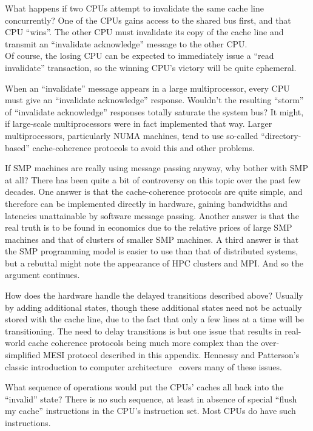 \begin{enumerate}
\QuickQ{}
	What happens if two CPUs attempt to invalidate the
	same cache line concurrently?
\QuickA{}
	One of the CPUs gains access
	to the shared bus first,
	and that CPU ``wins''.  The other CPU must invalidate its copy of the
	cache line and transmit an ``invalidate acknowledge'' message
	to the other CPU. \\
	Of course, the losing CPU can be expected to immediately issue a
	``read invalidate'' transaction, so the winning CPU's victory will
	be quite ephemeral.

\QuickQ{}
	When an ``invalidate'' message appears in a large multiprocessor,
	every CPU must give an ``invalidate acknowledge'' response.
	Wouldn't the resulting ``storm'' of ``invalidate acknowledge''
	responses totally saturate the system bus?
\QuickA{}
	It might, if large-scale multiprocessors were in fact implemented
	that way.  Larger multiprocessors, particularly NUMA machines,
	tend to use so-called ``directory-based'' cache-coherence
	protocols to avoid this and other problems.

\QuickQ{}
	If SMP machines are really using message passing
	anyway, why bother with SMP at all?
\QuickA{}
	There has been quite a bit of controversy on this topic over
	the past few decades.  One answer is that the cache-coherence
	protocols are quite simple, and therefore can be implemented
	directly in hardware, gaining bandwidths and latencies
	unattainable by software message passing.  Another answer is that
	the real truth is to be found in economics due to the relative
	prices of large SMP machines and that of clusters of smaller
	SMP machines.  A third answer is that the SMP programming
	model is easier to use than that of distributed systems, but
	a rebuttal might note the appearance of HPC clusters and MPI.
	And so the argument continues.

\QuickQ{}
	How does the hardware handle the delayed transitions
	described above?
\QuickA{}
	Usually by adding additional states, though these additional
	states need not be actually stored with the cache line, due to
	the fact that only a few lines at a time will be transitioning.
	The need to delay transitions is but one issue that results in
	real-world cache coherence protocols being much more complex than
	the over-simplified MESI protocol described in this appendix.
	Hennessy and Patterson's classic introduction to computer
	architecture~\cite{Hennessy95a} covers many of these issues.

\QuickQ{}
	What sequence of operations would put the CPUs' caches
	all back into the ``invalid'' state?
\QuickA{}
	There is no such sequence, at least in absence of special
	``flush my cache'' instructions in the CPU's instruction set.
	Most CPUs do have such instructions.


\end{enumerate}
